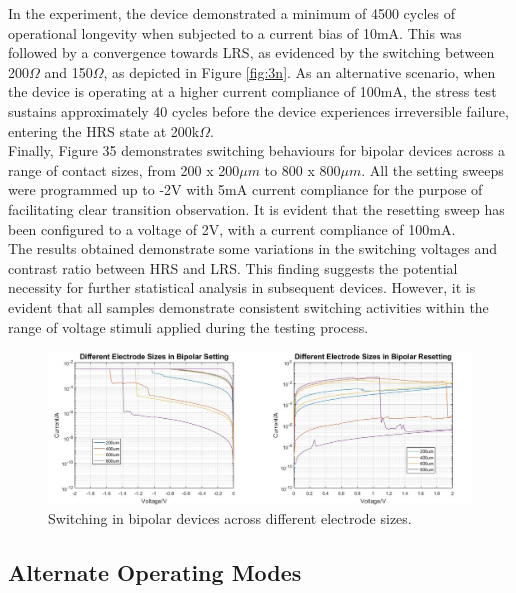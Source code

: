\noindent In the experiment, the device demonstrated a minimum of 4500 cycles of operational longevity when subjected to a current bias of 10mA. This was followed by a convergence towards LRS, as evidenced by the switching between 200$\Omega$ and 150$\Omega$, as depicted in Figure \ref{fig:3n}. As an alternative scenario, when the device is operating at a higher current compliance of 100mA, the stress test sustains approximately 40 cycles before the device experiences irreversible failure, entering the HRS state at 200k$\Omega$. \\


\noindent Finally, Figure 35 demonstrates switching behaviours for bipolar devices across a range of contact sizes, from 200 x 200$\mu m$ to 800 x 800$\mu m$. All the setting sweeps were programmed up to -2V with 5mA current compliance for the purpose of facilitating clear transition observation. It is evident that the resetting sweep has been configured to a voltage of 2V, with a current compliance of 100mA. \\

\noindent The results obtained demonstrate some variations in the switching voltages and contrast ratio between HRS and LRS. This finding suggests the potential necessity for further statistical analysis in subsequent devices. However, it is evident that all samples demonstrate consistent switching activities within the range of voltage stimuli applied during the testing process.

\begin{figure}[htbp!] 
    \centering    
    \includegraphics[width=1\textwidth]{Chapter3/Figs/o.png}
    \caption[Switching in bipolar devices across different electrode sizes.]{Switching in bipolar devices across different electrode sizes.}
    \label{fig:3o}
\end{figure}

\subsection[Alternate Operating Modes]{Alternate Operating Modes}

